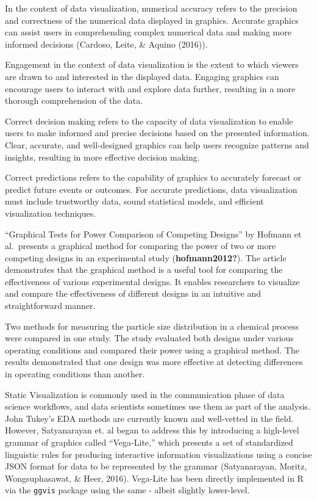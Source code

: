 \documentclass[print]{nuthesis}
\begin{document}
In the context of data visualization, numerical accuracy refers to the precision and correctness of the numerical data displayed in graphics.
Accurate graphics can assist users in comprehending complex numerical data and making more informed decisions (Cardoso, Leite, \& Aquino (2016)).

Engagement in the context of data visualization is the extent to which viewers are drawn to and interested in the displayed data.
Engaging graphics can encourage users to interact with and explore data further, resulting in a more thorough comprehension of the data.

Correct decision making refers to the capacity of data visualization to enable users to make informed and precise decisions based on the presented information.
Clear, accurate, and well-designed graphics can help users recognize patterns and insights, resulting in more effective decision making.

Correct predictions refers to the capability of graphics to accurately forecast or predict future events or outcomes.
For accurate predictions, data visualization must include trustworthy data, sound statistical models, and efficient visualization techniques.

``Graphical Tests for Power Comparison of Competing Designs'' by Hofmann et al.~presents a graphical method for comparing the power of two or more competing designs in an experimental study (\textbf{hofmann2012?}).
The article demonstrates that the graphical method is a useful tool for comparing the effectiveness of various experimental designs.
It enables researchers to visualize and compare the effectiveness of different designs in an intuitive and straightforward manner.

Two methods for measuring the particle size distribution in a chemical process were compared in one study.
The study evaluated both designs under various operating conditions and compared their power using a graphical method.
The results demonstrated that one design was more effective at detecting differences in operating conditions than another.

Static Visualization is commonly used in the communication phase of data science workflows, and data scientists sometimes use them as part of the analysis.
John Tukey's EDA methods are currently known and well-vetted in the field.
However, Satyanarayan et. al began to address this by introducing a high-level grammar of graphics called ``Vega-Lite,'' which presents a set of standardized linguistic rules for producing interactive information visualizations using a concise JSON format for data to be represented by the grammar (Satyanarayan, Moritz, Wongsuphasawat, \& Heer, 2016).
Vega-Lite has been directly implemented in R via the \texttt{ggvis} package using the same - albeit slightly lower-level.
\end{document}
